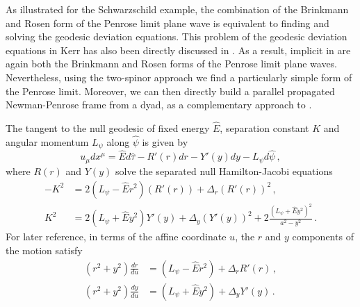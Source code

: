 As illustrated for the Schwarzschild example, the combination of the Brinkmann and Rosen form of the Penrose limit plane wave is equivalent to finding and solving the geodesic deviation equations. This problem of the geodesic deviation equations in Kerr has also been directly discussed in \cite{Cariglia:2018erv}. As a result, implicit in \cite{Cariglia:2018erv} are again both the Brinkmann and Rosen forms of the Penrose limit plane waves. Nevertheless, using the two-spinor approach we find a particularly simple form of the Penrose limit. Moreover, we can then directly build a parallel propagated Newman-Penrose frame from a dyad, as a complementary approach to \cite{Kubiznak:2008zs}.

The tangent to the null geodesic of fixed energy $\hat{E}$, separation constant $K$ and angular momentum $L_{\psi}$ along $\hat{\psi}$ is given by
\begin{equation}\label{Penrose:eqn:ukerr}
u_{\mu}dx^{\mu} = \hat{E}d\hat{\tau} - R'(r)dr - Y'(y)dy -L_{\psi} d\hat{\psi} \, ,
\end{equation}
where $R(r)$ and $Y(y)$ solve the separated null Hamilton-Jacobi equations
\begin{equation}\label{Penrose:eqn:uKerr}
\begin{aligned}
-K^2 &= 2 \left(L_{\psi}-\hat{E} r^2 \right) \left(R'\left(r\right)\right)+\Delta_r \left(R'\left(r\right)\right)^2 \, , \\
K^2 &= 2(L_{\psi}+\hat{E}y^2)Y'\left(y\right)+\Delta_y \left(Y'\left(y\right)\right)^2 + 2\frac{\left(L_{\psi}+\hat{E}y^2 \right)^2}{a^2-y^2} \, .
\end{aligned}
\end{equation}
For later reference, in terms of the affine coordinate $u$, the $r$ and $y$ components of the motion satisfy
\begin{equation}\label{Penrose:eqn:Kgeod}
\begin{aligned}
\left(r^2+y^2\right)\frac{dr}{du} &=  \left(L_{\psi}-\hat{E} r^2 \right) + \Delta_r R'(r) \, , \\
\left(r^2+y^2\right)\frac{dy}{du} &=  \left(L_{\psi}+\hat{E} y^2 \right) + \Delta_y Y'(y) \, .
\end{aligned}
\end{equation}

